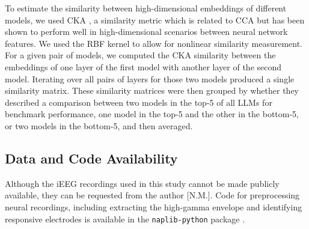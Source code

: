 To estimate the similarity between high-dimensional embeddings of different models, we used CKA \cite{kornblith2019similarity}, a similarity metric which is related to CCA but has been shown to perform well in high-dimensional scenarios between neural network features. We used the RBF kernel to allow for nonlinear similarity measurement. For a given pair of models, we computed the CKA similarity between the embeddings of one layer of the first model with another layer of the second model. Iterating over all pairs of layers for those two models produced a single similarity matrix. These similarity matrices were then grouped by whether they described a comparison between two models in the top-5 of all LLMs for benchmark performance, one model in the top-5 and the other in the bottom-5, or two models in the bottom-5, and then averaged.

\subsection{Data and Code Availability}

Although the iEEG recordings used in this study cannot be made publicly available, they can be requested from the author [N.M.]. Code for preprocessing neural recordings, including extracting the high-gamma envelope and identifying responsive electrodes is available in the \texttt{naplib-python} package \cite{mischler2023naplib}.


